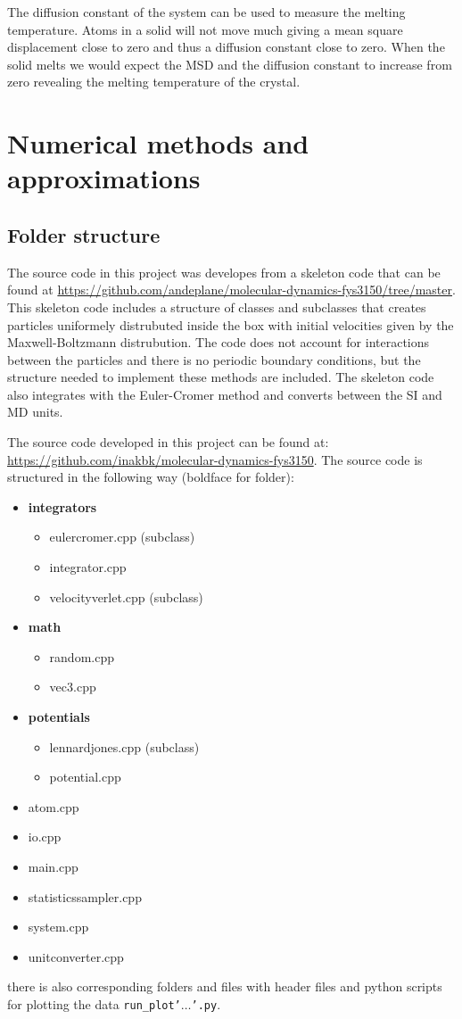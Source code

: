 \documentclass[11pt,a4wide]{article}
\begin{document}
The diffusion constant of the system can be used to measure the melting temperature. Atoms in a solid will not move much giving a mean square displacement close to zero and thus a diffusion constant close to zero. When the solid melts we would expect the MSD and the diffusion constant to increase from zero revealing the melting temperature of the crystal. 

\section{Numerical methods and approximations}
\subsection{Folder structure}

The source code in this project was developes from a skeleton code that can be found at \url{https://github.com/andeplane/molecular-dynamics-fys3150/tree/master}. This skeleton code includes a structure of classes and subclasses that creates particles uniformely distrubuted inside the box with initial velocities given by the Maxwell-Boltzmann distrubution. The code does not account for  interactions between the particles and there is no periodic boundary conditions, but the structure needed to implement these methods are included. The skeleton code also integrates with the Euler-Cromer method and converts between the SI and MD units. 

The source code developed in this project can be found at: \url{https://github.com/inakbk/molecular-dynamics-fys3150}. The source code is structured in the following way (boldface for folder): 
\begin{itemize}
\item \textbf{integrators}
\begin{itemize}
\item eulercromer.cpp (subclass)
\item integrator.cpp
\item velocityverlet.cpp (subclass)
\end{itemize}
\item \textbf{math}
\begin{itemize}
\item random.cpp
\item vec3.cpp
\end{itemize}
\item \textbf{potentials}
\begin{itemize}
\item lennardjones.cpp (subclass)
\item potential.cpp
\end{itemize}
\item atom.cpp
\item io.cpp
\item main.cpp
\item statisticssampler.cpp
\item system.cpp
\item unitconverter.cpp
\end{itemize}
there is also corresponding folders and files with header files and python scripts for plotting the data \texttt{run\_plot'$\dots$'.py}. 
\end{document}
